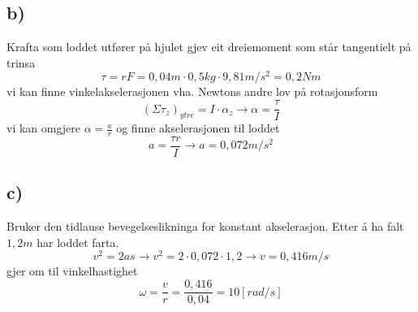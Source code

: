 \documentclass[12pt,a4paper]{article}
\begin{document}
    \subsection*{b)}
    Krafta som loddet utfører på hjulet gjev eit dreiemoment som står tangentielt på trinsa
    \begin{equation}
      \tau = rF = 0,04m\cdot0,5kg\cdot9,81m/s^2 = 0,2Nm
    \end{equation}
    vi kan finne vinkelakselerasjonen vha. Newtons andre lov på rotasjonsform
    \begin{equation}
      (\Sigma \tau_z)_{ytre} = I\cdot \alpha_z \longrightarrow \alpha = \frac{\tau}{I}
    \end{equation}
    vi kan omgjere $\alpha = \frac{a}{r}$ og finne akselerasjonen til loddet
    \begin{equation}
      a = \frac{\tau r}{I} \rightarrow a = 0,072m/s^2
    \end{equation}

    \subsection*{c)}
    Bruker den tidlause bevegelseslikninga for konstant akselerasjon.
    Etter å ha falt $1,2m$ har loddet farta.
    \begin{equation}
      v^2 = 2as \rightarrow v^2 = 2\cdot0,072\cdot1,2\rightarrow v = 0,416m/s
    \end{equation}
    gjer om til vinkelhastighet 
    \begin{equation}
      \omega = \frac{v}{r} = \frac{0,416}{0,04} = 10[rad/s]
    \end{equation}
    
\end{document}
